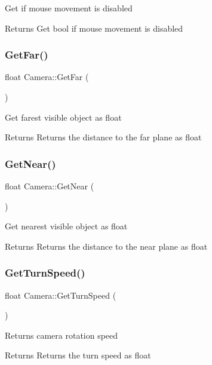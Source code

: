 Get if mouse movement is disabled \begin{DoxyReturn}{Returns}
Get bool if mouse movement is disabled 
\end{DoxyReturn}
\mbox{\label{class_camera_a44d06d5d21a3075cb59abe1d00505077}} 
\subsubsection{\texorpdfstring{GetFar()}{GetFar()}}
{\footnotesize\ttfamily float Camera\+::\+Get\+Far (\begin{DoxyParamCaption}{ }\end{DoxyParamCaption})}

Get farest visible object as float \begin{DoxyReturn}{Returns}
Returns the distance to the far plane as float 
\end{DoxyReturn}
\mbox{\label{class_camera_ac84e690c0103031a959c7434cbc18f04}} 
\subsubsection{\texorpdfstring{GetNear()}{GetNear()}}
{\footnotesize\ttfamily float Camera\+::\+Get\+Near (\begin{DoxyParamCaption}{ }\end{DoxyParamCaption})}

Get nearest visible object as float \begin{DoxyReturn}{Returns}
Returns the distance to the near plane as float 
\end{DoxyReturn}
\mbox{\label{class_camera_a3111d980c55e40f41ae19daee9a2d2f2}} 
\subsubsection{\texorpdfstring{GetTurnSpeed()}{GetTurnSpeed()}}
{\footnotesize\ttfamily float Camera\+::\+Get\+Turn\+Speed (\begin{DoxyParamCaption}{ }\end{DoxyParamCaption})}

Returns camera rotation speed \begin{DoxyReturn}{Returns}
Returns the turn speed as float 
\end{DoxyReturn}
\mbox{\label{class_camera_ad38a19d516d7a5f1663fb08de222d074}} 
